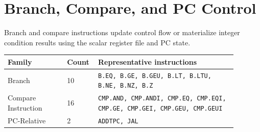 \medskip

\medskip

\medskip

\medskip

\medskip

\medskip

\medskip

\medskip

\medskip

\medskip

\medskip

\medskip

\medskip

\medskip

\medskip

\section{Branch, Compare, and PC Control}
Branch and compare instructions update control flow or materialize integer condition results using the scalar register file and PC state.\par\smallskip
{\scriptsize
\begin{longtable}{@{}L{0.24\linewidth}R{0.09\linewidth}L{0.56\linewidth}@{}}
\toprule
Family & Count & Representative instructions \\
\midrule
Branch & 10 & \texttt{B.EQ, B.GE, B.GEU, B.LT, B.LTU, B.NE, B.NZ, B.Z} \\
Compare Instruction & 16 & \texttt{CMP.AND, CMP.ANDI, CMP.EQ, CMP.EQI, CMP.GE, CMP.GEI, CMP.GEU, CMP.GEUI} \\
PC-Relative & 2 & \texttt{ADDTPC, JAL} \\
\bottomrule
\end{longtable}
}

